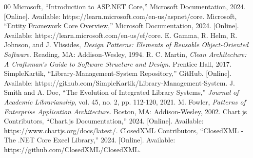 \documentclass[conference]{IEEEtran}
\begin{document}
\begin{thebibliography}{00}
 Microsoft, ``Introduction to ASP.NET Core,'' Microsoft Documentation, 2024. [Online]. Available: https://learn.microsoft.com/en-us/aspnet/core.
 Microsoft, ``Entity Framework Core Overview,'' Microsoft Documentation, 2024. [Online]. Available: https://learn.microsoft.com/en-us/ef/core.
 E. Gamma, R. Helm, R. Johnson, and J. Vlissides, \textit{Design Patterns: Elements of Reusable Object-Oriented Software}. Reading, MA: Addison-Wesley, 1994.
 R. C. Martin, \textit{Clean Architecture: A Craftsman's Guide to Software Structure and Design}. Prentice Hall, 2017.
 SimpleKartik, ``Library-Management-System Repository,'' GitHub. [Online]. Available: https://github.com/SimpleKartik/Library-Management-System.
 J. Smith and A. Doe, ``The Evolution of Integrated Library Systems,'' \textit{Journal of Academic Librarianship}, vol. 45, no. 2, pp. 112-120, 2021.
 M. Fowler, \textit{Patterns of Enterprise Application Architecture}. Boston, MA: Addison-Wesley, 2002.
 Chart.js Contributors, ``Chart.js Documentation,'' 2024. [Online]. Available: https://www.chartjs.org/docs/latest/.
 ClosedXML Contributors, ``ClosedXML - The .NET Core Excel Library,'' 2024. [Online]. Available: https://github.com/ClosedXML/ClosedXML.
\end{thebibliography}
\end{document}
